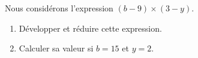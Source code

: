 
\begin{exercice}\label{exo2smath-0235}

    Nous considérons l'expression \( (b-9)\times (3-y)\).
    \begin{enumerate}
        \item
            Développer et réduire cette expression.
        \item
            Calculer sa valeur si \( b=15\) et \( y=2\).
    \end{enumerate}

\end{exercice}
